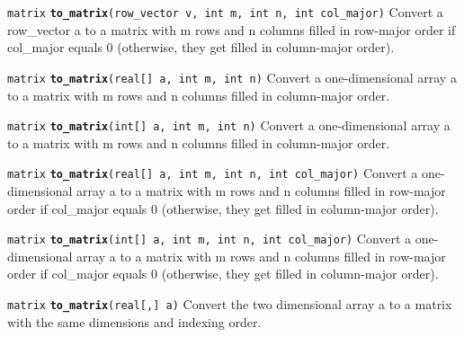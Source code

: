 \documentclass[
  10pt,
]{book}
\begin{document}
\texttt{matrix} \textbf{\texttt{to\_matrix}}\texttt{(row\_vector\ v,\ int\ m,\ int\ n,\ int\ col\_major)}\newline
Convert a row\_vector a to a matrix with m rows and n columns filled in
row-major order if col\_major equals 0 (otherwise, they get filled in
column-major order).


\texttt{matrix} \textbf{\texttt{to\_matrix}}\texttt{(real{[}{]}\ a,\ int\ m,\ int\ n)}\newline
Convert a one-dimensional array a to a matrix with m rows and n
columns filled in column-major order.


\texttt{matrix} \textbf{\texttt{to\_matrix}}\texttt{(int{[}{]}\ a,\ int\ m,\ int\ n)}\newline
Convert a one-dimensional array a to a matrix with m rows and n
columns filled in column-major order.


\texttt{matrix} \textbf{\texttt{to\_matrix}}\texttt{(real{[}{]}\ a,\ int\ m,\ int\ n,\ int\ col\_major)}\newline
Convert a one-dimensional array a to a matrix with m rows and n
columns filled in row-major order if col\_major equals 0 (otherwise,
they get filled in column-major order).


\texttt{matrix} \textbf{\texttt{to\_matrix}}\texttt{(int{[}{]}\ a,\ int\ m,\ int\ n,\ int\ col\_major)}\newline
Convert a one-dimensional array a to a matrix with m rows and n
columns filled in row-major order if col\_major equals 0 (otherwise,
they get filled in column-major order).


\texttt{matrix} \textbf{\texttt{to\_matrix}}\texttt{(real{[},{]}\ a)}\newline
Convert the two dimensional array a to a matrix with the same
dimensions and indexing order.

\end{document}
